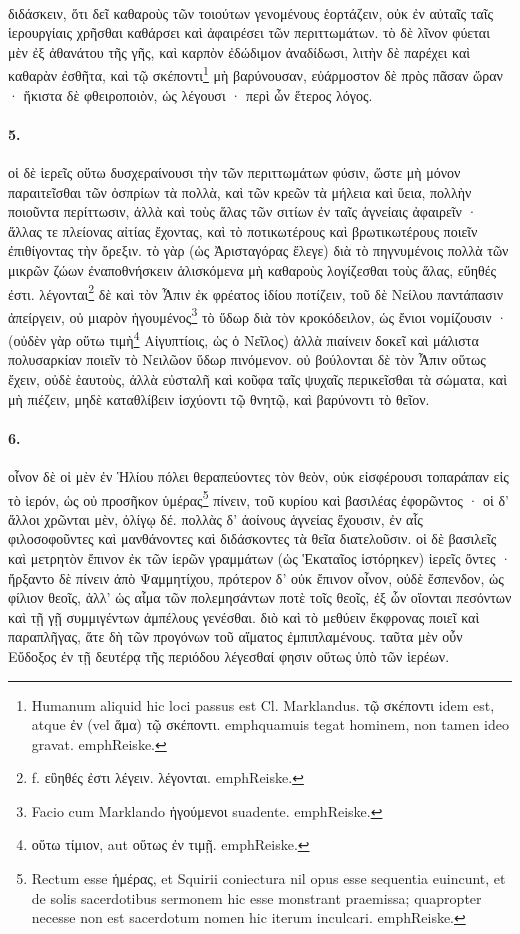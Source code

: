 \documentclass[a4paper, 11pt, oneside, polutonikogreek, german]{article}
\begin{document}
\paragraph{}
διδάσκειν, ὅτι δεῖ καθαροὺς τῶν τοιούτων γενομένους ἑορτάζειν, οὐκ ἐν αὐταῖς ταῖς ἱερουργίαις χρῆσθαι καθάρσει καὶ ἀφαιρέσει τῶν περιττωμάτων. τὸ δὲ λῖνον φύεται μὲν ἐξ ἀθανάτου τῆς γῆς, καὶ καρπὸν ἐδώδιμον ἀναδίδωσι, λιτὴν δὲ παρέχει καὶ καθαρὰν ἐσθῆτα, καὶ τῷ σκέποντι\footnote{Humanum aliquid hic loci passus est Cl. Marklandus. τῷ σκέποντι idem est, atque ἐν (vel ἅμα) τῷ σκέποντι. emph{quamuis tegat hominem, non tamen ideo gravat.} emph{Reiske.}} μὴ βαρύνουσαν, εὐάρμοστον δὲ πρὸς πᾶσαν ὥραν · ἥκιστα δὲ φθειροποιὸν, ὡς λέγουσι · περὶ ὧν ἕτερος λόγος.

\paragraph{5.}
οἱ δὲ ἱερεῖς οὕτω δυσχεραίνουσι τὴν τῶν περιττωμάτων φύσιν, ὥστε μὴ μόνον παραιτεῖσθαι τῶν ὀσπρίων τὰ πολλὰ, καὶ τῶν κρεῶν τὰ μήλεια καὶ ὕεια, πολλὴν ποιοῦντα περίττωσιν, ἀλλὰ καὶ τοὺς ἅλας τῶν σιτίων ἐν ταῖς ἁγνείαις ἀφαιρεῖν · ἄλλας τε πλείονας αἰτίας ἔχοντας, καὶ τὸ ποτικωτέρους καὶ βρωτικωτέρους ποιεῖν ἐπιθίγοντας τὴν ὄρεξιν. τὸ γὰρ (ὡς Ἀρισταγόρας ἔλεγε) διὰ τὸ πηγνυμένοις πολλὰ τῶν μικρῶν ζώων ἐναποθνήσκειν ἁλισκόμενα μὴ καθαροὺς λογίζεσθαι τοὺς ἅλας, εὔηθές ἐστι. λέγονται\footnote{f. εὒηθές ἐστι λέγειν. λέγονται. emph{Reiske.}} δὲ καὶ τὸν Ἆπιν ἐκ φρέατος ἰδίου ποτίζειν, τοῦ δὲ Νείλου παντάπασιν ἀπείργειν, οὐ μιαρὸν ἡγουμένος\footnote{Facio cum Marklando ἡγούμενοι suadente. emph{Reiske.}} τὸ ὕδωρ διὰ τὸν κροκόδειλον, ὡς ἔνιοι νομίζουσιν · (οὐδὲν γὰρ οὕτω τιμὴ\footnote{οὕτω τίμιον, aut οὕτως ἐν τιμῇ. emph{Reiske.}} Αἰγυπτίοις, ὡς ὁ Νεῖλος) ἀλλὰ πιαίνειν δοκεῖ καὶ μάλιστα πολυσαρκίαν ποιεῖν τὸ Νειλῶον ὕδωρ πινόμενον. οὐ βούλονται δὲ τὸν Ἆπιν οὕτως ἔχειν, οὐδὲ ἑαυτοὺς, ἀλλὰ εὐσταλῆ καὶ κοῦφα ταῖς ψυχαῖς περικεῖσθαι τὰ σώματα, καὶ μὴ πιέζειν, μηδὲ καταθλίβειν ἰσχύοντι τῷ θνητῷ, καὶ βαρύνοντι τὸ θεῖον.

\paragraph{6.}
οἶνον δὲ οἱ μὲν ἐν Ἡλίου πόλει θεραπεύοντες τὸν θεὸν, οὐκ εἰσφέρουσι τοπαράπαν εἰς τὸ ἱερόν, ὡς οὐ προσῆκον ὑμέρας\footnote{Rectum esse ἡμέρας, et Squirii coniectura nil opus esse sequentia euincunt, et de solis sacerdotibus sermonem hic esse monstrant praemissa; quapropter necesse non est sacerdotum nomen hic iterum inculcari. emph{Reiske.}} πίνειν, τοῦ κυρίου καὶ βασιλέας ἐφορῶντος · οἱ δ' ἄλλοι χρῶνται μὲν, ὀλίγῳ δέ. πολλὰς δ' ἀοίνους ἁγνείας ἔχουσιν, ἐν αἷς φιλοσοφοῦντες καὶ μανθάνοντες καὶ διδάσκοντες τὰ θεῖα διατελοῦσιν. οἱ δὲ βασιλεῖς καὶ μετρητὸν ἔπινον ἐκ τῶν ἱερῶν γραμμάτων (ὡς Ἑκαταῖος ἱστόρηκεν) ἱερεῖς ὄντες · ἤρξαντο δὲ πίνειν ἀπὸ Ψαμμητίχου, πρότερον δ' οὐκ ἔπινον οἶνον, οὐδὲ ἔσπενδον, ὡς φίλιον θεοῖς, ἀλλ' ὡς αἷμα τῶν πολεμησάντων ποτὲ τοῖς θεοῖς, ἐξ ὧν οἴονται πεσόντων καὶ τῇ γῇ συμμιγέντων ἀμπέλους γενέσθαι. διὸ καὶ τὸ μεθύειν ἔκφρονας ποιεῖ καὶ παραπλῆγας, ἅτε δὴ τῶν προγόνων τοῦ αἵματος ἐμπιπλαμένους. ταῦτα μὲν οὖν Εὔδοξος ἐν τῇ δευτέρᾳ τῆς περιόδου λέγεσθαί φησιν οὕτως ὑπὸ τῶν ἱερέων.
\end{document}
